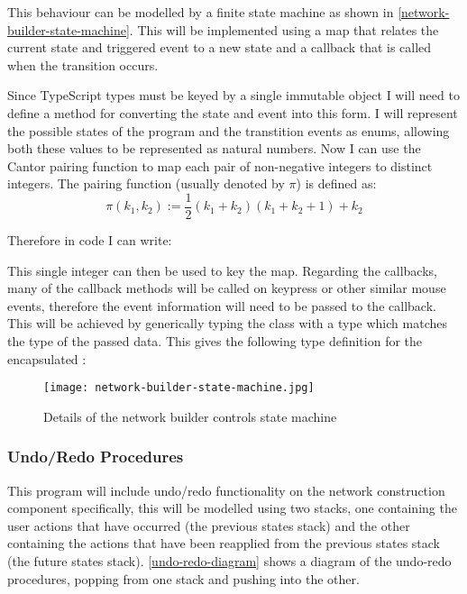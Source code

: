             This behaviour can be modelled by a finite state machine as shown in \autoref{network-builder-state-machine}. This will be implemented using a map that relates the current state and triggered event to a new state and a callback that is called when the transition occurs.

            Since TypeScript  types must be keyed by a single immutable object I will need to define a method for converting the state and event into this form. I will represent the possible states of the program and the transtition events as enums, allowing both these values to be represented as natural numbers. Now I can use the Cantor pairing function \cite{cantor-pairing-function} to map each pair of non-negative integers to distinct integers. The pairing function (usually denoted by $\pi$) is defined as: \[\pi(k_1, k_2) := \frac{1}{2}(k_1 + k_2)(k_1 + k_2 + 1) + k_2\]

            Therefore in code I can write:


            This single integer can then be used to key the map. Regarding the callbacks, many of the callback methods will be called on keypress or other similar mouse events, therefore the event information will need to be passed to the callback. This will be achieved by generically typing the class with a  type which matches the type of the passed data. This gives the following type definition for the encapsulated :


            \begin{figure}
                \centering
                \texttt{[image: network-builder-state-machine.jpg]}
                \caption{Details of the network builder controls state machine}
                \label{network-builder-state-machine}
            \end{figure}

        \subsubsection{Undo/Redo Procedures}
            This program will include undo/redo functionality on the network construction component specifically, this will be modelled using two stacks, one containing the user actions that have occurred (the previous states stack) and the other containing the actions that have been reapplied from the previous states stack (the future states stack). \autoref{undo-redo-diagram} shows a diagram of the undo-redo procedures, popping from one stack and pushing into the other.

